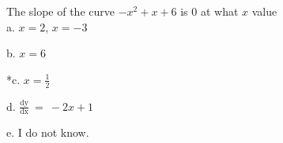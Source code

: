 
The slope of the curve \( -x^{2}+x+6 \) is \( 0 \) at what \( x \) value\\

a. \(x = 2 \), \( x = -3 \)

b. \( x = 6 \)

*c. \( x = \frac{1}{2}\)

d. \(\frac{\text{dy}}{\text{dx}}\  = \  - 2x + 1\)

e. I do not know.\\

